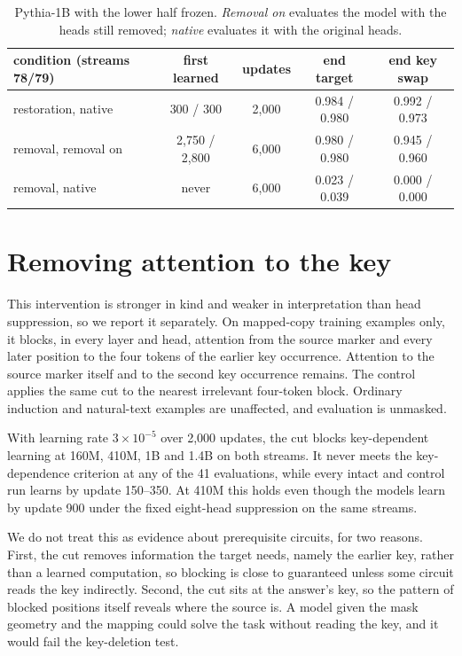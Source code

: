 \begin{table}[!htbp]
\centering\small
\caption{Pythia-1B with the lower half frozen. \emph{Removal on} evaluates the
model with the heads still removed; \emph{native} evaluates it with the original
heads.}
\label{tab:prefix}
\begin{tabular}{lcccc}\toprule
condition (streams 78/79) & first learned & updates & end target & end key swap \\
\midrule
restoration, native & 300 / 300 & 2,000 & 0.984 / 0.980 & 0.992 / 0.973 \\
removal, removal on & 2,750 / 2,800 & 6,000 & 0.980 / 0.980 & 0.945 / 0.960 \\
removal, native & never & 6,000 & 0.023 / 0.039 & 0.000 / 0.000 \\
\bottomrule\end{tabular}
\end{table}

\section{Removing attention to the key}
\label{app:edges}
This intervention is stronger in kind and weaker in interpretation than head
suppression, so we report it separately. On mapped-copy training examples only, it
blocks, in every layer and head, attention from the source marker and every later
position to the four tokens of the earlier key occurrence. Attention to the source
marker itself and to the second key occurrence remains. The control applies the
same cut to the nearest irrelevant four-token block. Ordinary induction and
natural-text examples are unaffected, and evaluation is unmasked.

With learning rate $3\times10^{-5}$ over 2,000 updates, the cut blocks key-dependent
learning at 160M, 410M, 1B and 1.4B on both streams. It never meets the
key-dependence criterion at any of the 41 evaluations, while every intact and
control run learns by update 150--350. At 410M this holds even though the models
learn by update 900 under the fixed eight-head suppression on the same streams.

We do not treat this as evidence about prerequisite circuits, for two reasons.
First, the cut removes information the target needs, namely the earlier key, rather
than a learned computation, so blocking is close to guaranteed unless some circuit
reads the key indirectly. Second, the cut sits at the answer's key, so the pattern
of blocked positions itself reveals where the source is. A model given the mask
geometry and the mapping could solve the task without reading the key, and it would
fail the key-deletion test.

